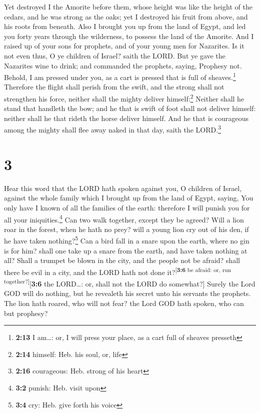  Yet destroyed I the Amorite before them, whose height was
like the height of the cedars, and he was strong as the oaks; yet I
destroyed his fruit from above, and his roots from beneath.
 Also I brought you up from the land of Egypt, and led
you forty years through the wilderness, to possess the land of the
Amorite.  And I raised up of your sons for prophets, and
of your young men for Nazarites. Is it not even thus, O ye children of
Israel? saith the LORD.  But ye gave the Nazarites wine
to drink; and commanded the prophets, saying, Prophesy not.
 Behold, I am pressed under you, as a cart is pressed
that is full of sheaves.\footnote{\textbf{2:13} I am\ldots: or, I will
  press your place, as a cart full of sheaves presseth} 
Therefore the flight shall perish from the swift, and the strong shall
not strengthen his force, neither shall the mighty deliver
himself:\footnote{\textbf{2:14} himself: Heb. his soul, or, life}
 Neither shall he stand that handleth the bow; and he
that is swift of foot shall not deliver himself: neither shall he that
rideth the horse deliver himself.  And he that is
courageous among the mighty shall flee away naked in that day, saith the
LORD.\footnote{\textbf{2:16} courageous: Heb. strong of his heart}

\hypertarget{section-2}{%
\section{3}\label{section-2}}

 Hear this word that the LORD hath spoken against you, O
children of Israel, against the whole family which I brought up from the
land of Egypt, saying,  You only have I known of all the
families of the earth: therefore I will punish you for all your
iniquities.\footnote{\textbf{3:2} punish: Heb. visit upon}
 Can two walk together, except they be agreed?
 Will a lion roar in the forest, when he hath no prey?
will a young lion cry out of his den, if he have taken
nothing?\footnote{\textbf{3:4} cry: Heb. give forth his voice}
 Can a bird fall in a snare upon the earth, where no gin
is for him? shall one take up a snare from the earth, and have taken
nothing at all?  Shall a trumpet be blown in the city, and
the people not be afraid? shall there be evil in a city, and the LORD
hath not done it?\textsuperscript{{[}\textbf{3:6} be afraid: or, run
together?{]}}{[}\textbf{3:6} the LORD\ldots: or, shall not the LORD do
somewhat?{]}  Surely the Lord GOD will do nothing, but he
revealeth his secret unto his servants the prophets.  The
lion hath roared, who will not fear? the Lord GOD hath spoken, who can
but prophesy?

